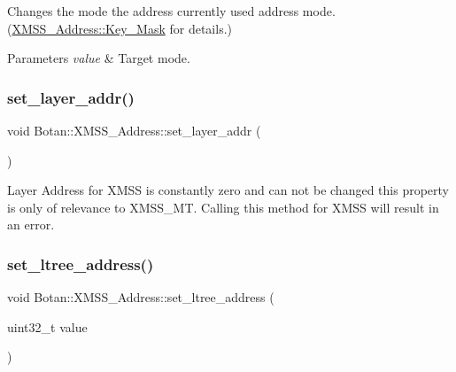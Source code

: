 Changes the mode the address currently used address mode. (\hyperlink{class_botan_1_1_x_m_s_s___address_a85146c0c3e049f62c413194049f501e3}{X\+M\+S\+S\+\_\+\+Address\+::\+Key\+\_\+\+Mask} for details.)


\begin{DoxyParams}{Parameters}
{\em value} & Target mode. \\
\hline
\end{DoxyParams}
\mbox{\label{class_botan_1_1_x_m_s_s___address_aca1e7f785ce8f328bd108c9cd63bde11}} 
\subsubsection{\texorpdfstring{set\+\_\+layer\+\_\+addr()}{set\_layer\_addr()}}
{\footnotesize\ttfamily void Botan\+::\+X\+M\+S\+S\+\_\+\+Address\+::set\+\_\+layer\+\_\+addr (\begin{DoxyParamCaption}{ }\end{DoxyParamCaption})\hspace{0.3cm}{\ttfamily [inline]}}

Layer Address for X\+M\+SS is constantly zero and can not be changed this property is only of relevance to X\+M\+S\+S\+\_\+\+MT. Calling this method for X\+M\+SS will result in an error. \mbox{\label{class_botan_1_1_x_m_s_s___address_af410fcbcc750a12e8650307d51003bc2}} 
\subsubsection{\texorpdfstring{set\+\_\+ltree\+\_\+address()}{set\_ltree\_address()}}
{\footnotesize\ttfamily void Botan\+::\+X\+M\+S\+S\+\_\+\+Address\+::set\+\_\+ltree\+\_\+address (\begin{DoxyParamCaption}\item[{uint32\+\_\+t}]{value }\end{DoxyParamCaption})\hspace{0.3cm}{\ttfamily [inline]}}

